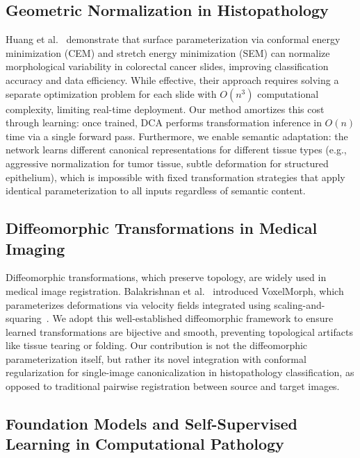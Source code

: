 \documentclass[10pt,journal,compsoc]{IEEEtran}
\begin{document}
\subsection{Geometric Normalization in Histopathology}

Huang et al.~\cite{huang2024surface} demonstrate that surface parameterization via conformal energy minimization (CEM) and stretch energy minimization (SEM) can normalize morphological variability in colorectal cancer slides, improving classification accuracy and data efficiency. While effective, their approach requires solving a separate optimization problem for each slide with $O(n^3)$ computational complexity, limiting real-time deployment. Our method amortizes this cost through learning: once trained, DCA performs transformation inference in $O(n)$ time via a single forward pass. Furthermore, we enable semantic adaptation: the network learns different canonical representations for different tissue types (e.g., aggressive normalization for tumor tissue, subtle deformation for structured epithelium), which is impossible with fixed transformation strategies that apply identical parameterization to all inputs regardless of semantic content.

\subsection{Diffeomorphic Transformations in Medical Imaging}

Diffeomorphic transformations, which preserve topology, are widely used in medical image registration. Balakrishnan et al.~\cite{balakrishnan2019voxelmorph} introduced VoxelMorph, which parameterizes deformations via velocity fields integrated using scaling-and-squaring~\cite{arsigny2006logdiff}. We adopt this well-established diffeomorphic framework to ensure learned transformations are bijective and smooth, preventing topological artifacts like tissue tearing or folding. Our contribution is not the diffeomorphic parameterization itself, but rather its novel integration with conformal regularization for single-image canonicalization in histopathology classification, as opposed to traditional pairwise registration between source and target images.

\subsection{Foundation Models and Self-Supervised Learning in Computational Pathology}
\end{document}
